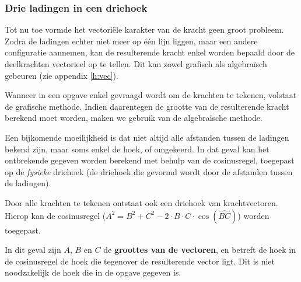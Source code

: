 \documentclass{ximera}
\begin{document}
\subsubsection{Drie ladingen in een driehoek}
Tot nu toe vormde het vectoriële karakter van de kracht geen groot probleem. Zodra de ladingen echter niet meer op één lijn liggen, maar een andere configuratie aannemen, kan de resulterende kracht enkel worden bepaald door de deelkrachten vectorieel op te tellen. Dit kan zowel grafisch als algebraïsch gebeuren (zie appendix \ref{h:vec}).

Wanneer in een opgave enkel gevraagd wordt om de krachten te tekenen, volstaat de grafische methode. Indien daarentegen de grootte van de resulterende kracht berekend moet worden, maken we gebruik van de algebraïsche methode.

Een bijkomende moeilijkheid is dat niet altijd alle afstanden tussen de ladingen bekend zijn, maar soms enkel de hoek, of omgekeerd. In dat geval kan het ontbrekende gegeven worden berekend met behulp van de cosinusregel, toegepast op de \textsl{fysieke} driehoek (de driehoek die gevormd wordt door de afstanden tussen de ladingen).

Door alle krachten te tekenen ontstaat ook een driehoek van krachtvectoren. Hierop kan de cosinusregel ($A^{2} = B^{2} + C^{2} - 2 \cdot B \cdot C \cdot \cos(\widehat{BC})$) worden toegepast.

\begin{remark}[title={Let op bij de cosinusregel}]
In dit geval zijn $A$, $B$ en $C$ de \textbf{groottes van de vectoren}, en betreft de hoek in de cosinusregel de hoek die tegenover de resulterende vector ligt. Dit is niet noodzakelijk de hoek die in de opgave gegeven is.
\end{remark}
\end{document}
